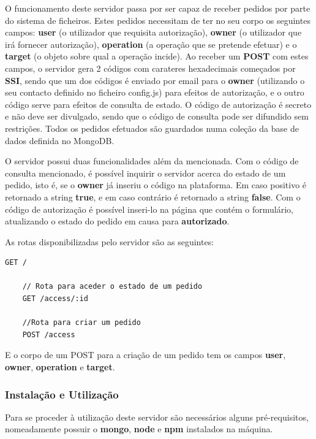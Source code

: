O funcionamento deste servidor passa por ser capaz de receber pedidos por parte do sistema de ficheiros. Estes pedidos necessitam de ter no seu corpo os seguintes campos: \textbf{user} (o utilizador que requisita autorização), \textbf{owner} (o utilizador que irá fornecer autorização), \textbf{operation} (a operação que se pretende efetuar)  e o \textbf{target} (o objeto sobre qual a operação incide). Ao receber um \textbf{POST} com estes campos, o servidor gera 2 códigos com carateres hexadecimais começados por \textbf{SSI}, sendo que um dos códigos é enviado por email para o \textbf{owner} (utilizando o seu contacto definido no ficheiro config.js) para efeitos de autorização, e o outro código serve para efeitos de consulta de estado. O código de autorização é secreto e não deve ser divulgado, sendo que o código de consulta pode ser difundido sem restrições. Todos os pedidos efetuados são guardados numa coleção da base de dados definida no MongoDB.

O servidor possui duas funcionalidades além da mencionada. Com o código de consulta mencionado, é possível inquirir o servidor acerca do estado de um pedido, isto é, se o \textbf{owner} já inseriu o código na plataforma. Em caso positivo é retornado a string \textbf{true}, e em caso contrário é retornado a string \textbf{false}. Com o código de autorização é possível inseri-lo na página que contém o formulário, atualizando o estado do pedido em causa para \textbf{autorizado}.
 
As rotas disponibilizadas pelo servidor são as seguintes:

\begin{lstlisting}[basicstyle=\small]
    GET /
    
    // Rota para aceder o estado de um pedido
    GET /access/:id
    
    //Rota para criar um pedido
    POST /access
\end{lstlisting}

E o corpo de um POST para a criação de um pedido tem os campos \textbf{user}, \textbf{owner}, \textbf{operation} e \textbf{target}.

\subsubsection{Instalação e Utilização}

Para se proceder à utilização deste servidor são necessários alguns pré-requisitos, nomeadamente possuir o \textbf{mongo}, \textbf{node} e \textbf{npm} instalados na máquina.

